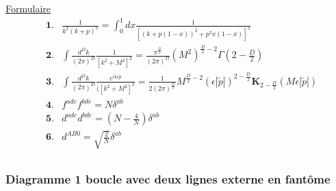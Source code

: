 \documentclass[a4paper,11pt]{article}
\theoremstyle{plain}
\theoremstyle{definition}
\theoremstyle{remark}
\numberwithin{equation}{section}
\numberwithin{equation}{subsection}
\numberwithin{figure}{section}
\begin{document}
\noindent
\underline{Formulaire}
\begin{eqnarray*}
 &\textbf{1.}& \frac{1}{k^2 (k+p)^2 }  =  \int_{0}^{1}   dx  \frac{1}{ \left[ (k+p(1-x))^2  +  p^2 x(1-x) \right]^2  }  \\
 &\textbf{2.}&  \int  \frac{d^D k}{(2 \pi)^D}   \frac{1}{\left[ k^2 + M^2 \right]^2 }  =  \frac{ \pi^{\frac{D}{2}} }{ (2 \pi)^{D}  }  (M^2)^{\frac{D}{2}-2} \Gamma(2-\frac{D}{2}) \\
 &\textbf{3.}& \int  \frac{d^D k}{(2 \pi)^D}   \frac{e^{ik \epsilon \tilde{p}}}{(\left[ k^2 + M^2 \right]^2 }  =   \frac{1}{2 (2 \pi )^{ \frac{D}{2}}}  M^{\frac{D}{2} - 2}  \left( \epsilon \left| \tilde{p}  \right|  \right)^{ 2-\frac{D}{2} }   \textbf{K}_{2- \frac{D}{2}  } ( M  \epsilon \left| \tilde{p}  \right|  )   \\
&\textbf{4.}&  f^{ade} f^{bde}  =  N  \delta^{ab}  \\
&\textbf{5.}&  d^{ade} d^{bde}  =  \left( N - \frac{4}{N} \right)  \delta^{ab}  \\
&\textbf{6.}&  d^{AB0} = \sqrt{\frac{2}{N}}  \delta^{ab}  \\
\end{eqnarray*}

\subsubsection{Diagramme 1 boucle avec deux lignes externe en fantôme}
\end{document}
